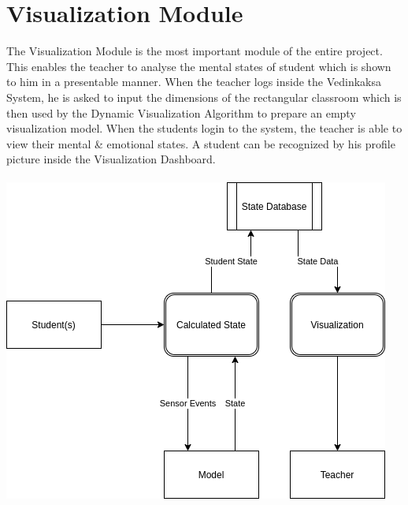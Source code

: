 \documentclass[10pt]{report}
\begin{document}
\section{Visualization Module}
The Visualization Module is the most important module of the entire project. This enables the teacher to analyse the mental states of student which is shown to him in a presentable manner. When the teacher logs inside the Vedinkaksa System, he is asked to input the dimensions of the rectangular classroom which is then used by the Dynamic Visualization Algorithm to prepare an empty visualization model. When the students login to the system, the teacher is able to view their mental \& emotional states. A student can be recognized by his profile picture inside the Visualization Dashboard. \\ \\
\includegraphics[width=\textwidth]{VisualizationModule.png}  
\end{document}
